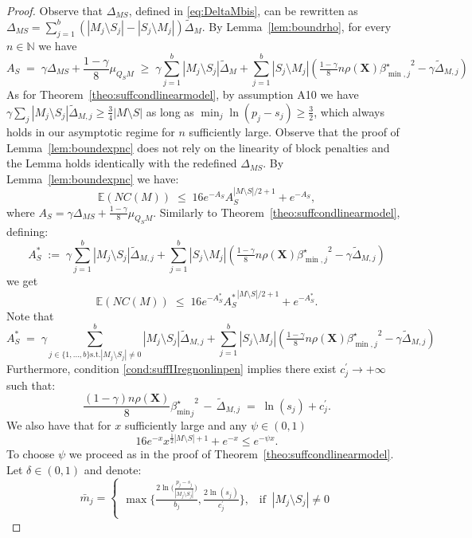\documentclass[aos]{imsart}
\theoremstyle{plain}
\newcommand{\E}{\mathbb{E}}
\newcommand{\N}{\mathbb{N}}
\newcommand{\bs}{\boldsymbol}
\begin{document}
\begin{supplement}
\begin{proof}
Observe that $\Delta_{MS}$, defined in \eqref{eq:DeltaMbis}, can be rewritten as $\Delta_{MS}=\sum_{j=1}^b(|M_j\setminus S_j|-|S_j\setminus M_j|)\tilde{\Delta}_{M}$. By  Lemma~\ref{lem:boundrho}, for every $n\in \N$ we have 
\begin{equation}\label{eq:nonoverfittingcond}
   A_S\;=\; \gamma \Delta_{MS}+\frac{1-\gamma}{8}\mu_{Q_SM}\;\geq\; \gamma\sum_{j=1}^b|M_j \setminus S_j|\tilde{\Delta}_{M} + \sum_{j=1}^b |S_j\setminus M_j |\left(\tfrac{1-\gamma}{8} n \rho(\bs X) {\beta^{\star}_{\min,j}}^{2} - \gamma\tilde{\Delta}_{M, j}\right) 
\end{equation} 
As for Theorem~\ref{theo:suffcondlinearmodel}, by assumption A10 we have $\gamma\sum_{j}|M_j\setminus S_j|\tilde{\Delta}_{M, j}\geq \tfrac{3}{4}|M\setminus S|$ as long as $\min_j \ln(p_j-s_j)\geq \tfrac32$, which always holds in our asymptotic regime for $n$ sufficiently large. Observe that the proof of Lemma~\ref{lem:boundexpnc} does not rely on the linearity of block penalties and the Lemma holds identically with the redefined $\Delta_{MS}$.  By Lemma~\ref{lem:boundexpnc} we have:
$$
\E(NC(M))\;\leq\;16 e^{-A_S}A_S^{|M\setminus S|/2+1}+e^{-A_S},
$$
where $A_S=\gamma\Delta_{MS}+\tfrac{1-\gamma}{8}\mu_{Q_SM}$. Similarly to Theorem~\ref{theo:suffcondlinearmodel}, defining:
$$A_S^*\;:=\;\gamma\sum_{j=1}^b|M_j \setminus S_j|\tilde{\Delta}_{M, j} + \sum_{j=1}^b |S_j\setminus M_j |\left(\tfrac{1-\gamma}{8} n \rho(\bs X) {\beta^{\star}_{\min,j}}^{2} - \gamma\tilde{\Delta}_{M, j}\right) $$
we get 
$$
\E(NC(M))\;\leq\;16 e^{-A_S^*}{A_S^*}^{|M\setminus S|/2+1}+e^{-A_S^*}.
$$
Note that 
$$A_S^*\;=\;\gamma\sum_{j \in \{1,\ldots, b\} \text{s.t.} |M_j \setminus S_j| \neq 0}^b|M_j \setminus S_j|\tilde{\Delta}_{M, j} + \sum_{j=1}^b |S_j\setminus M_j |\left(\tfrac{1-\gamma}{8} n \rho(\bs X) {\beta^{\star}_{\min,j}}^{2} - \gamma\tilde{\Delta}_{M, j}\right) $$
Furthermore, condition \eqref{cond:suffIIregnonlinpen} implies there exist $c^{\prime}_j \to +\infty$ such that:
$$\frac{(1-\gamma) n\rho(\bs X)}{8}{{\beta_{\min}^{\star}}_j}^2 \,- \,\tilde{\Delta}_{M, j} \;=\; \ln(s_j) + c^{\prime}_{j}.$$
We also have that for $x$ sufficiently large and any $\psi \in (0,1)$
\begin{equation}%
16e^{-x}x^{\tfrac12|M\setminus S|+1}+e^{-x}\leq e^{-\psi x}.    
\end{equation}
To choose $\psi$ we proceed as in the proof of Theorem~\ref{theo:suffcondlinearmodel}. Let $\delta \in (0,1)$ and denote:
$$\bar{m}_j=\begin{cases}
    \max\bigg\{\tfrac{2\ln\big(\tfrac{p_j-s_j}{|M_j\setminus S_j|}\big)}{b_{j}},\tfrac{2\ln(s_j)}{c^{\prime}_{j}}\bigg\},\;\;\; \text{if}\;\;|M_j \setminus S_j| \neq 0 \\

\end{cases}$$
\end{proof}
\end{supplement}
\end{document}
